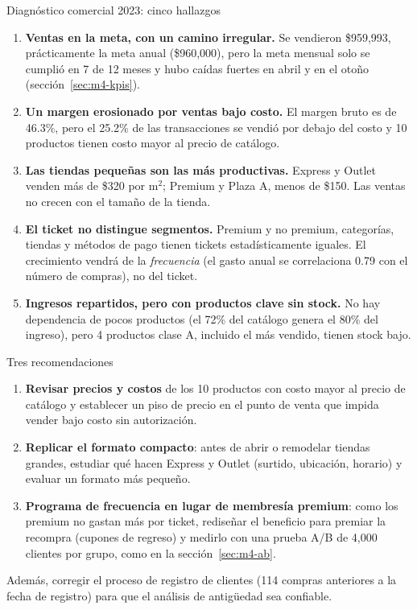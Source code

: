 \begin{negocio}{Diagnóstico comercial 2023: cinco hallazgos}
\begin{enumerate}
  \item \textbf{Ventas en la meta, con un camino irregular.} Se vendieron
        \$959,993, prácticamente la meta anual (\$960,000), pero la meta
        mensual solo se cumplió en 7 de 12 meses y hubo caídas fuertes en
        abril y en el otoño (sección~\ref{sec:m4-kpis}).
  \item \textbf{Un margen erosionado por ventas bajo costo.} El margen bruto
        es de 46.3\%, pero el 25.2\% de las transacciones se vendió por
        debajo del costo y 10 productos tienen costo mayor al precio de
        catálogo.
  \item \textbf{Las tiendas pequeñas son las más productivas.} Express y
        Outlet venden más de \$320 por m$^2$; Premium y Plaza A, menos de
        \$150. Las ventas no crecen con el tamaño de la tienda.
  \item \textbf{El ticket no distingue segmentos.} Premium y no premium,
        categorías, tiendas y métodos de pago tienen tickets estadísticamente
        iguales. El crecimiento vendrá de la \emph{frecuencia} (el gasto
        anual se correlaciona 0.79 con el número de compras), no del ticket.
  \item \textbf{Ingresos repartidos, pero con productos clave sin stock.}
        No hay dependencia de pocos productos (el 72\% del catálogo genera
        el 80\% del ingreso), pero 4 productos clase A, incluido el más
        vendido, tienen stock bajo.
\end{enumerate}
\end{negocio}

\begin{negocio}{Tres recomendaciones}
\begin{enumerate}
  \item \textbf{Revisar precios y costos} de los 10 productos con costo
        mayor al precio de catálogo y establecer un piso de precio en el
        punto de venta que impida vender bajo costo sin autorización.
  \item \textbf{Replicar el formato compacto}: antes de abrir o remodelar
        tiendas grandes, estudiar qué hacen Express y Outlet (surtido,
        ubicación, horario) y evaluar un formato más pequeño.
  \item \textbf{Programa de frecuencia en lugar de membresía premium}:
        como los premium no gastan más por ticket, rediseñar el beneficio
        para premiar la recompra (cupones de regreso) y medirlo con una
        prueba A/B de 4,000 clientes por grupo, como en la
        sección~\ref{sec:m4-ab}.
\end{enumerate}
Además, corregir el proceso de registro de clientes (114 compras anteriores
a la fecha de registro) para que el análisis de antigüedad sea confiable.
\end{negocio}

